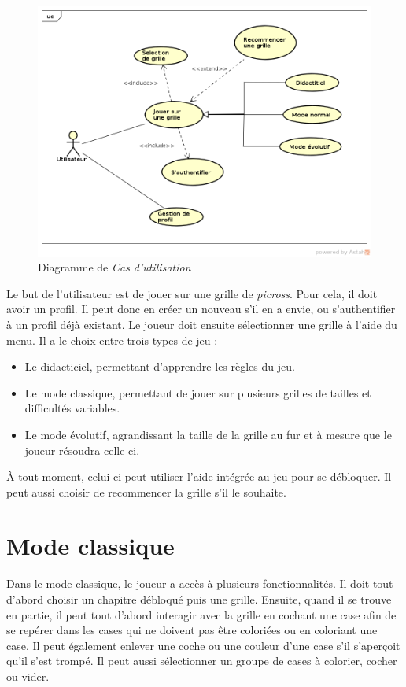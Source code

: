 \documentclass{report}
\begin{document}
    \begin{figure}[H]
	\caption{Diagramme de \textit{Cas d’utilisation}}
	\includegraphics[width=17cm]{../UML/UseCase_diagram/UseCase1.png}
    \end{figure}
    

	Le but de l'utilisateur est de jouer sur une grille de \textit{picross}.
Pour cela, il doit avoir un profil. Il peut donc en créer un nouveau s'il en a envie, ou s'authentifier à un profil déjà existant.
	Le joueur doit ensuite sélectionner une grille à l'aide du menu. Il a le choix entre trois types de jeu :
	\begin{itemize}
	\item Le didacticiel, permettant d'apprendre les règles du jeu. 
	\item Le mode classique, permettant de jouer sur plusieurs grilles de tailles et difficultés variables.
	\item Le mode évolutif, agrandissant la taille de la grille au fur et à mesure que le joueur résoudra celle-ci.
	\end{itemize}
	
	À tout moment, celui-ci peut utiliser l'aide intégrée au jeu pour se débloquer. Il peut aussi choisir de recommencer la grille s'il le souhaite.

      
	\section{Mode classique}
		Dans le mode classique, le joueur a accès à plusieurs fonctionnalités. Il doit tout d'abord choisir un chapitre débloqué puis une grille. Ensuite, quand il se trouve en partie, il peut tout d'abord interagir avec la grille en cochant une case afin de se repérer dans les cases qui ne doivent pas être coloriées ou en coloriant une case. Il peut également enlever une coche ou une couleur d'une case s'il s'aperçoit qu'il s'est trompé. Il peut aussi sélectionner un groupe de cases à colorier, cocher ou vider. 
		
\end{document}
